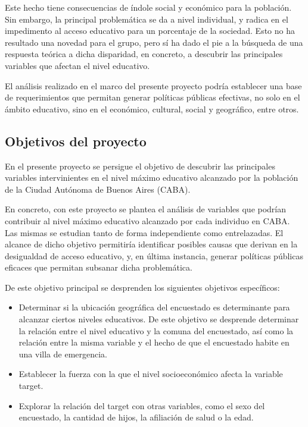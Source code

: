 \documentclass[a4paper]{article}
\begin{document}
        Este hecho tiene consecuencias de índole social y económico para la población. Sin embargo, la principal problemática se da a nivel individual, y radica en el impedimento al acceso educativo para un porcentaje de la sociedad. Esto no ha resultado una novedad para el grupo, pero sí ha dado el pie a la búsqueda de una respuesta teórica a dicha disparidad, en concreto, a descubrir las principales variables que afectan el nivel educativo.

        El análisis realizado en el marco del presente proyecto podría establecer una base de requerimientos que permitan generar políticas públicas efectivas, no solo en el ámbito educativo, sino en el económico, cultural, social y geográfico, entre otros.

    \subsection{Objetivos del proyecto}

        En el presente proyecto se persigue el objetivo de descubrir las principales variables intervinientes en el nivel máximo educativo alcanzado por la población de la Ciudad Autónoma de Buenos Aires (CABA).
        
        En concreto, con este proyecto se plantea el análisis de variables que podrían contribuir al nivel máximo educativo alcanzado por cada individuo en CABA. Las mismas se estudian tanto de forma independiente como entrelazadas. El alcance de dicho objetivo permitiría identificar posibles causas que derivan en la desigualdad de acceso educativo, y, en última instancia, generar políticas públicas eficaces que permitan subsanar dicha problemática. 

    De este objetivo principal se desprenden los siguientes objetivos específicos:
    \begin{itemize}
        \item Determinar si la ubicación geográfica del encuestado es determinante para alcanzar ciertos niveles educativos. De este objetivo se desprende determinar la relación entre el nivel educativo y la comuna del encuestado, así como la relación entre la misma variable y el hecho de que el encuestado habite en una villa de emergencia.
        \item Establecer la fuerza con la que el nivel socioeconómico afecta la variable target.
        \item Explorar la relación del target con otras variables, como el sexo del encuestado, la cantidad de hijos, la afiliación de salud o la edad.
    \end{itemize}
\end{document}
